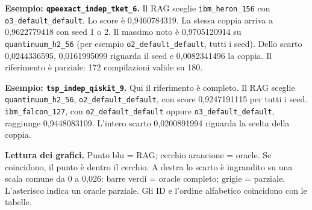 \documentclass[10pt,a4paper,landscape]{article}
\begin{document}
\medskip\textbf{Esempio: \texttt{qpeexact\_indep\_tket\_6}.}
Il RAG sceglie \texttt{ibm\_heron\_156} con \texttt{o3\_default\_default}.
Lo score è 0,9460784319. La stessa coppia arriva a 0,9622779418 con seed 1 o 2.
Il massimo noto è 0,9705120914 su \texttt{quantinuum\_h2\_56}
(per esempio \texttt{o2\_default\_default}, tutti i seed).
Dello scarto 0,0244336595, 0,0161995099 riguarda il seed e 0,0082341496 la coppia.
Il riferimento è parziale: 172 compilazioni valide su 180.

\textbf{Esempio: \texttt{tsp\_indep\_qiskit\_9}.}
Qui il riferimento è completo. Il RAG sceglie \texttt{quantinuum\_h2\_56},
\texttt{o2\_default\_default}, con score 0,9247191115 per tutti i seed.
\texttt{ibm\_falcon\_127}, con \texttt{o2\_default\_default} oppure
\texttt{o3\_default\_default}, raggiunge 0,9448083109.
L'intero scarto 0,0200891994 riguarda la scelta della coppia.

\textbf{Lettura dei grafici.}
Punto blu = RAG; cerchio arancione = oracle. Se coincidono, il punto è dentro il cerchio.
A destra lo scarto è ingrandito su una scala comune da 0 a 0,026:
barre verdi = oracle completo; grigie = parziale. L'asterisco indica un oracle parziale.
Gli ID e l'ordine alfabetico coincidono con le tabelle.
\end{document}
